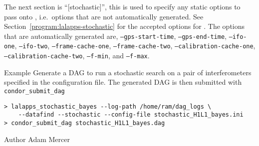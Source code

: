\begin{entry}
The next section is ``[stochastic]'', this is used to specify any static
options to pass onto , i.e.~options that are
not automatically generated. See
Section~\ref{program:lalapps-stochastic} for the accepted options for
. The options that are automatically generated
are, \texttt{--gps-start-time}, \texttt{--gps-end-time},
\texttt{--ifo-one}, \texttt{--ifo-two}, \texttt{--frame-cache-one},
\texttt{--frame-cache-two}, \texttt{--calibration-cache-one},\\
\texttt{--calibration-cache-two}, \texttt{--f-min}, and
\texttt{--f-max}.

\item[Example]
Generate a DAG to run a stochastic search on a pair of interferometers
specified in the configuration file. The generated DAG is then submitted
with \texttt{condor\_submit\_dag}

\begin{verbatim}
> lalapps_stochastic_bayes --log-path /home/ram/dag_logs \
    --datafind --stochastic --config-file stochastic_H1L1_bayes.ini
> condor_submit_dag stochastic_H1L1_bayes.dag
\end{verbatim}

\item[Author]
Adam Mercer
\end{entry}
